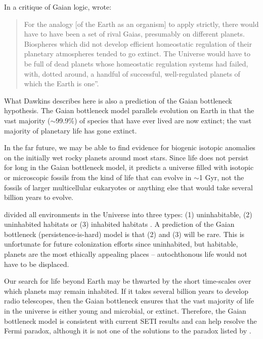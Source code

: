 In a critique of Gaian logic, \citet[p.236]{Dawkins1982} wrote:
\begin{quotation}
	For the analogy [of the Earth as an organism] to apply strictly, there would have to have been a set of rival Gaias, presumably on different planets. Biospheres which did not develop
	efficient homeostatic regulation of their planetary atmospheres tended to go extinct. The
	Universe would have to be full of dead planets whose homeostatic regulation systems had failed,
	with, dotted around, a handful of successful, well-regulated planets of which the Earth is one''.
\end{quotation}

What Dawkins describes here is also a prediction of the Gaian bottleneck hypothesis. The Gaian bottleneck model parallels evolution on Earth in that the vast majority ($\sim$99.9\%) of species that have ever lived are now extinct; the vast majority of planetary life has gone extinct.

In the far future, we may be able to find evidence for biogenic isotopic anomalies on the initially wet rocky planets around most stars. Since life does not persist for long in the Gaian bottleneck model, it predicts a universe filled with isotopic or microscopic fossils
from the kind of life that can evolve in $\sim$1 Gyr, not the fossils of larger multicellular eukaryotes or anything else that would take several billion years to evolve.

\citet{Cockell2014} divided all environments in the Universe into three types: (1) uninhabitable, (2) uninhabited habitats or (3) inhabited habitats \citep{Cockell2011,Zuluaga2014}. A prediction of the Gaian bottleneck (persistence-is-hard) model is that (2) and (3) will be rare. This is unfortunate for future colonization efforts since uninhabited, but habitable, planets are the most ethically appealing places -- autochthonous life would not have to be displaced.

Our search for life beyond Earth may be thwarted by the short time-scales over which planets may remain inhabited. If it takes several billion years to develop radio telescopes, then the Gaian bottleneck ensures that the vast majority of life in the universe is either young and microbial, or extinct. Therefore, the Gaian bottleneck model is consistent with current SETI results and can help resolve the Fermi paradox, although it is not one of the solutions to the paradox listed by \citet{Webb2002}.

	
\clearpage
